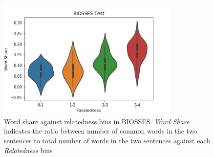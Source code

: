 \begin{enumerate}
\begin{figure}
	\centering
	\includegraphics[width=0.8\textwidth]{figures/semantic_textual_similarity/introduction/biosses_word_share.png}
	\caption[Word share against relatedness bins in BIOSSES.]{Word share against relatedness bins in BIOSSES. \textit{Word Share} indicates the ratio between number of common words in the two sentences to total number of words in the two sentences against each \textit{Relatedness} bins}
	\label{fig:biosses_word_share}
\end{figure}



	
	 

\end{enumerate}
